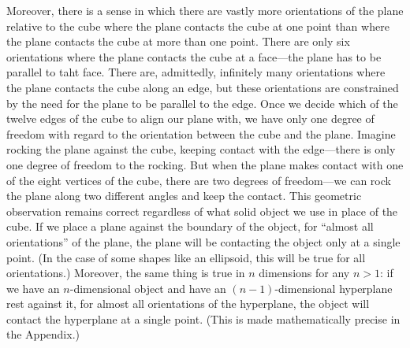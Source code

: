 Moreover, there is a sense in which there are vastly more orientations of the plane relative to the cube where the 
plane contacts the cube at one point than where the plane contacts the cube at more than one point. There are only 
six orientations where the plane contacts the cube at a face---the plane has to be parallel to taht face. There are, 
admittedly, infinitely many orientations where the plane contacts the cube along an edge, but these orientations 
are constrained by the need for the plane to be parallel to the edge. Once we decide which of the twelve edges of 
the cube to align our plane with, we have only one degree of freedom with regard to the orientation between the cube 
and the plane. Imagine rocking the plane against the cube, keeping contact with the edge---there is only one degree 
of freedom to the rocking. But when the plane makes contact with one of the eight vertices of the cube, there are two 
degrees of freedom—we can rock the plane along two different angles and keep the contact. This geometric observation 
remains correct regardless of what solid object we use in place of the cube. If we place a plane against the boundary 
of the object, for ``almost all orientations'' of the plane, the plane will be contacting the object only at a single 
point. (In the case of some shapes like an ellipsoid, this will be true for all orientations.) Moreover, the same thing is 
true in $n$ dimensions for any $n>1$: if we have an $n$-dimensional object and have an $(n-1)$-dimensional hyperplane rest 
against it, for almost all orientations of the hyperplane, the object will contact the hyperplane at a single point. 
(This is made mathematically precise in the Appendix.)

